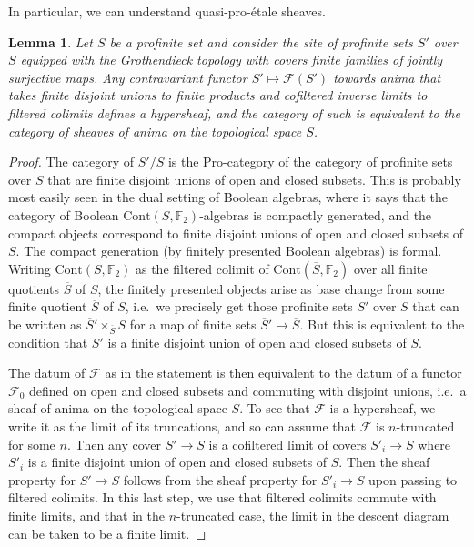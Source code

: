 \documentclass[11pt]{amsart}
\numberwithin{equation}{section}
\numberwithin{theorem}{section}
\newtheorem{lemma}[theorem]{Lemma}
\theoremstyle{definition}
\begin{document}
In particular, we can understand quasi-pro-\'etale sheaves.

\begin{lemma}\label{lem:quasiproetalesheafprofin} Let $S$ be a profinite set and consider the site of profinite sets $S'$ over $S$ equipped with the Grothendieck topology with covers finite families of jointly surjective maps. Any contravariant functor $S'\mapsto \mathcal F(S')$ towards anima that takes finite disjoint unions to finite products and cofiltered inverse limits to filtered colimits defines a hypersheaf, and the category of such is equivalent to the category of sheaves of anima on the topological space $S$.
\end{lemma}

\begin{proof} The category of $S'/S$ is the Pro-category of the category of profinite sets over $S$ that are finite disjoint unions of open and closed subsets. This is probably most easily seen in the dual setting of Boolean algebras, where it says that the category of Boolean $\mathrm{Cont}(S,\mathbb F_2)$-algebras is compactly generated, and the compact objects correspond to finite disjoint unions of open and closed subsets of $S$. The compact generation (by finitely presented Boolean algebras) is formal. Writing $\mathrm{Cont}(S,\mathbb F_2)$ as the filtered colimit of $\mathrm{Cont}(\overline{S},\mathbb F_2)$ over all finite quotients $\overline{S}$ of $S$, the finitely presented objects arise as base change from some finite quotient $\overline{S}$ of $S$, i.e.~we precisely get those profinite sets $S'$ over $S$ that can be written as $\overline{S}'\times_{\overline{S}} S$ for a map of finite sets $\overline{S}'\to \overline{S}$. But this is equivalent to the condition that $S'$ is a finite disjoint union of open and closed subsets of $S$.

The datum of $\mathcal F$ as in the statement is then equivalent to the datum of a functor $\mathcal F_0$ defined on open and closed subsets and commuting with disjoint unions, i.e.~a sheaf of anima on the topological space $S$. To see that $\mathcal F$ is a hypersheaf, we write it as the limit of its truncations, and so can assume that $\mathcal F$ is $n$-truncated for some $n$. Then any cover $S'\to S$ is a cofiltered limit of covers $S'_i\to S$ where $S'_i$ is a finite disjoint union of open and closed subsets of $S$. Then the sheaf property for $S'\to S$ follows from the sheaf property for $S'_i\to S$ upon passing to filtered colimits. In this last step, we use that filtered colimits commute with finite limits, and that in the $n$-truncated case, the limit in the descent diagram can be taken to be a finite limit.
\end{proof}
\end{document}
